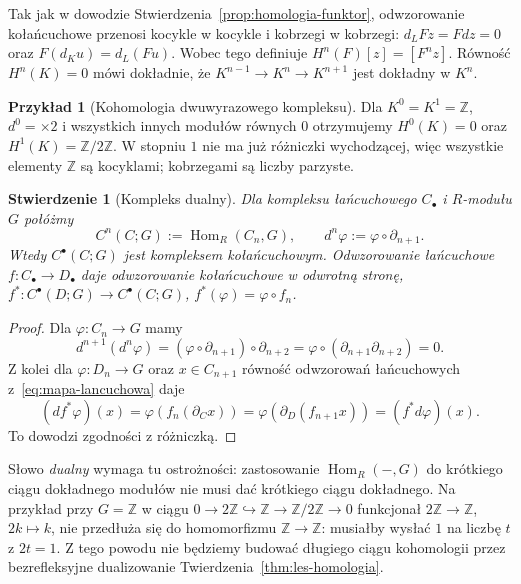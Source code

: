 \documentclass[11pt,a4paper,oneside]{report}
\newcommand{\Z}{\mathbb{Z}}
\theoremstyle{plain}
\newtheorem{stwierdzenie}[twierdzenie]{Stwierdzenie}
\theoremstyle{definition}
\newtheorem{przyklad}[twierdzenie]{Przykład}
\theoremstyle{remark}
\begin{document}
Tak jak w dowodzie
Stwierdzenia~\ref{prop:homologia-funktor},
odwzorowanie kołańcuchowe przenosi kocykle w
kocykle i kobrzegi w kobrzegi:
$d_LFz=Fdz=0$ oraz
$F(d_Ku)=d_L(Fu)$. Wobec tego definiuje
$H^n(F)[z]=[F^nz]$. Równość
$H^n(K)=0$ mówi dokładnie, że
$K^{n-1}\to K^n\to K^{n+1}$
jest dokładny w $K^n$.

\begin{przyklad}[Kohomologia dwuwyrazowego kompleksu]
Dla $K^0=K^1=\Z$, $d^0=\times2$
i wszystkich innych modułów równych $0$
otrzymujemy $H^0(K)=0$ oraz
$H^1(K)=\Z/2\Z$. W stopniu $1$ nie ma
już różniczki wychodzącej, więc
wszystkie elementy $\Z$ są kocyklami;
kobrzegami są liczby parzyste.
\end{przyklad}

\begin{stwierdzenie}[Kompleks dualny]
\label{prop:kompleks-dualny}
Dla kompleksu łańcuchowego $C_\bullet$
i $R$-modułu $G$ połóżmy
\[
 C^n(C;G):=\operatorname{Hom}_R(C_n,G),
 \qquad d^n\varphi:=\varphi\circ \partial_{n+1}.
\]
Wtedy $C^\bullet(C;G)$ jest kompleksem
kołańcuchowym. Odwzorowanie łańcuchowe
$f:C_\bullet\to D_\bullet$ daje odwzorowanie
kołańcuchowe w odwrotną stronę,
$f^*:C^\bullet(D;G)\to C^\bullet(C;G)$,
$f^*(\varphi)=\varphi\circ f_n$.
\end{stwierdzenie}
\begin{proof}
Dla $\varphi:C_n\to G$ mamy
\[
 d^{n+1}(d^n\varphi)
 =(\varphi\circ \partial_{n+1})\circ \partial_{n+2}
 =\varphi\circ(\partial_{n+1}\partial_{n+2})=0.
\]
Z kolei dla $\varphi:D_n\to G$
oraz $x\in C_{n+1}$ równość odwzorowań łańcuchowych
z~\eqref{eq:mapa-lancuchowa} daje
\[
 (d f^*\varphi)(x)
 =\varphi(f_n(\partial_C x))
 =\varphi(\partial_D(f_{n+1}x))
 =(f^*d\varphi)(x).
\]
To dowodzi zgodności z różniczką.
\end{proof}

Słowo \emph{dualny} wymaga tu ostrożności:
zastosowanie $\operatorname{Hom}_R(-,G)$
do krótkiego ciągu dokładnego modułów
nie musi dać krótkiego ciągu dokładnego.
Na przykład przy $G=\Z$ w ciągu
$0\to2\Z\hookrightarrow\Z\to\Z/2\Z\to0$
funkcjonał $2\Z\to\Z$, $2k\mapsto k$,
nie przedłuża się do homomorfizmu
$\Z\to\Z$: musiałby wysłać $1$
na liczbę $t$ z $2t=1$.
Z tego powodu nie będziemy budować
długiego ciągu kohomologii przez
bezrefleksyjne dualizowanie
Twierdzenia~\ref{thm:les-homologia}.
\end{document}
